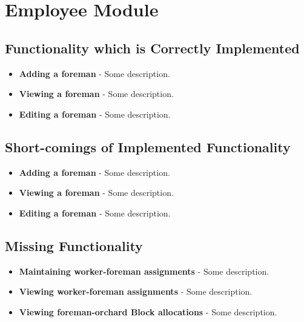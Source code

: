 \documentclass[11pt,fleqn]{book} %
\begin{document}

\chapter{Employee Module}
	\section{Functionality which is Correctly Implemented}
		\begin{itemize}
			\item\textbf{Adding a foreman} -
			Some description. 
			
			\item\textbf{Viewing a foreman} -
			Some description.
			
			\item\textbf{Editing a foreman} -
			Some description.
		\end{itemize}
	\section{Short-comings of Implemented Functionality}
		\begin{itemize}
			\item\textbf{Adding a foreman} -
			Some description. 
			
			\item\textbf{Viewing a foreman} -
			Some description.
			
			\item\textbf{Editing a foreman} -
			Some description.
		\end{itemize}
	\section{Missing Functionality}
		\begin{itemize}
			\item\textbf{Maintaining worker-foreman assignments} -
			Some description.
			
			\item\textbf{Viewing worker-foreman assignments} -
			Some description.
			
			\item\textbf{Viewing foreman-orchard Block allocations} -
			Some description.
		\end{itemize}
\end{document}
